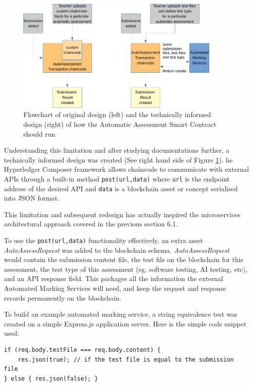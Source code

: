 \begin{figure}[!ht]
	\centering
	\includegraphics[width=0.9\textwidth]{automarkinglim}
	\caption[AutoAssessment Smart Contract Design Change]
	{Flowchart of original design (left) and the technically informed design (right) of how the Automatic Assessment Smart Contract should run}
	\label{fig:automarkinglim}
\end{figure}

Understanding this limitation and after studying documentations further, a technically informed design was created
(See right hand side of Figure \ref{fig:automarkinglim}). he Hyperledger Composer framework allows chaincode
to communicate with external APIs through a built-in method \texttt{post(url,data)} where \texttt{url} is
the endpoint address of the desired API and \texttt{data} is a blockchain asset or concept serialised into JSON format.

This limitation and subsequent redesign has actually inspired the microservices architectural approach covered in the previous section 6.1.

To use the \texttt{post(url,data)} functionality effectively, an extra asset \textit{AutoAssessRequest} was added to the blockchain schema.
\textit{AutoAssessRequest} would contain the submission content file, the test file on the blockchain for this assessment, the test type of
this assessment (eg. software testing, AI testing, etc), and an API response field. This packages all the information the external
Automated Marking Services will need, and keep the request and response records permanently on the blockchain.

To build an example automated marking service, a string equivalence test was created on a simple Express.js application server.
Here is the simple code snippet used:
\begin{verbatim}
if (req.body.testFile === req.body.content) {
    res.json(true); // if the test file is equal to the submission file
} else { res.json(false); } 
\end{verbatim}


